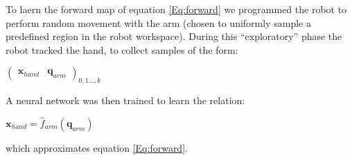 To laern the forward map of equation \ref{Eq:forward} we programmed the robot 
to perform random movement with the arm (chosen to uniformly sample 
a predefined region in the robot workspace). During this ``exploratory'' phase the robot
tracked the hand, to collect samples of the form:
%
\begin{center}
\begin{math}
  \left(\begin{array}{cc}
    \mathbf x_{hand} & \mathbf q_{arm} \end{array}\right)_{0,1\dots,k}
\end{math}
\end{center}
%
A neural network was then trained to learn the relation:
%
\begin{center} 
\begin{math}
  \mathbf x_{hand}=\hat{f}_{arm}\left(\mathbf q_{arm}\right)
\end{math}
\end{center}
%
which approximates equation \ref{Eq:forward}.




























